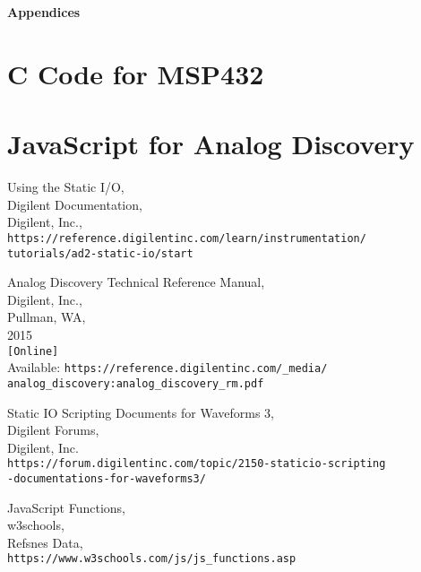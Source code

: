 \documentclass[12pt]{article}
\begin{document}
\pagebreak

\textbf{Appendices}

\begin{appendices}

\section{C Code for MSP432}



\section{JavaScript for Analog Discovery}



\end{appendices}

\begin{thebibliography}{9}

  Using the Static I/O, \\
  Digilent Documentation, \\
  Digilent, Inc., \\
  \verb!https://reference.digilentinc.com/learn/instrumentation/! \\
  \verb!tutorials/ad2-static-io/start!
  
 Analog Discovery Technical Reference Manual, \\
 Digilent, Inc., \\
 Pullman, WA, \\
 2015 \\
 \verb![Online]! \\
 Available: \verb!https://reference.digilentinc.com/_media/! \\
 \verb!analog_discovery:analog_discovery_rm.pdf!
 
 Static IO Scripting Documents for Waveforms 3, \\
 Digilent Forums, \\
 Digilent, Inc. \\
 \verb!https://forum.digilentinc.com/topic/2150-staticio-scripting! \\
 \verb!-documentations-for-waveforms3/!
 
 JavaScript Functions, \\
 w3schools, \\ 
 Refsnes Data, \\
 \verb!https://www.w3schools.com/js/js_functions.asp!

\end{thebibliography}
\end{document}

